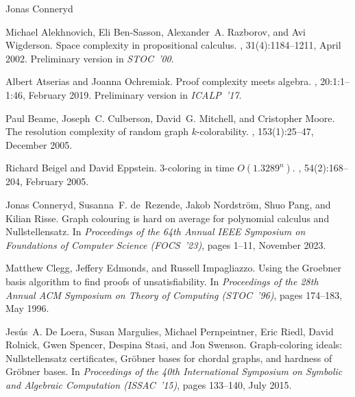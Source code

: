 \documentclass[report]{owrart}
\begin{document}
\begin{report}
\begin{talk}{Jonas Conneryd}
\begin{thebibliography}{99}
Michael Alekhnovich, Eli {Ben-Sasson}, Alexander~A. Razborov, and Avi
  Wigderson.
\newblock Space complexity in propositional calculus.
, 31(4):1184\nobreakdash--1211, April
  2002.
\newblock Preliminary version in \emph{STOC~'00}.

Albert Atserias and Joanna Ochremiak.
\newblock Proof complexity meets algebra.
,
  20:1:1\nobreakdash--1:46, February 2019.
\newblock Preliminary version in \emph{ICALP~'17}.

Paul Beame, Joseph~C. Culberson, David~G. Mitchell, and Cristopher Moore.
\newblock The resolution complexity of random graph
  $k$\nobreakdash-colorability.
,
  153(1):25\nobreakdash--47, December 2005.

Richard Beigel and David Eppstein.
\newblock $3$\nobreakdash-coloring in time ${O}({1.3289}^n)$.
, 54(2):168\nobreakdash--204, February
  2005.

  Jonas Conneryd, Susanna~F. de~Rezende, Jakob Nordstr\"{o}m, Shuo Pang, and
    Kilian Risse.
\newblock Graph colouring is hard on average for polynomial calculus and
    {N}ullstellensatz.
\newblock In {\em Proceedings of the 64th Annual {IEEE} Symposium on
    Foundations of Computer Science ({FOCS}~'23)}, pages 1\nobreakdash--11,
    November 2023.
  

Matthew Clegg, Jeffery Edmonds, and Russell Impagliazzo.
\newblock Using the {Groebner} basis algorithm to find proofs of
  unsatisfiability.
\newblock In {\em Proceedings of the 28th Annual {ACM} Symposium on Theory of
  Computing ({STOC}~'96)}, pages 174\nobreakdash--183, May 1996.

Jes{\'u}s~A. {De Loera}, Susan Margulies, Michael Pernpeintner, Eric Riedl,
  David Rolnick, Gwen Spencer, Despina Stasi, and Jon Swenson.
\newblock Graph-coloring ideals: {N}ullstellensatz certificates, {G}r{\"o}bner
  bases for chordal graphs, and hardness of {G}r{\"o}bner bases.
\newblock In {\em Proceedings of the 40th International Symposium on Symbolic
  and Algebraic Computation (ISSAC~'15)}, pages 133\nobreakdash--140, July
  2015.


\end{thebibliography}
\end{talk}
\end{report}
\end{document}

